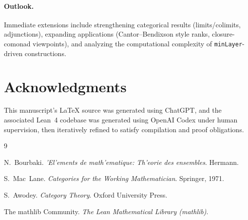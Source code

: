 \documentclass[11pt]{article}
\begin{document}
\paragraph{Outlook.}
Immediate extensions include strengthening categorical results (limits/colimits, adjunctions), expanding applications (Cantor--Bendixson style ranks, closure-comonad viewpoints), and analyzing the computational complexity of \texttt{minLayer}-driven constructions. %

\section*{Acknowledgments}
This manuscript's \LaTeX{} source was generated using ChatGPT, and the associated Lean~4 codebase was generated using OpenAI Codex under human supervision, then iteratively refined to satisfy compilation and proof obligations.

\begin{thebibliography}{9}

N.\ Bourbaki.
\newblock \emph{'{E}l'{e}ments de math'{e}matique: Th'{e}orie des ensembles}.
\newblock Hermann.

S.\ Mac~Lane.
\newblock \emph{Categories for the Working Mathematician}.
\newblock Springer, 1971.

S.\ Awodey.
\newblock \emph{Category Theory}.
\newblock Oxford University Press.

The mathlib Community.
\newblock \emph{The Lean Mathematical Library (mathlib)}.

\end{thebibliography}
\end{document}
